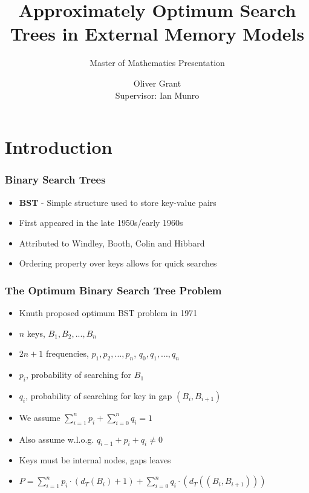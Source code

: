 \documentclass[]{beamer}
\title{Approximately Optimum Search
Trees in External Memory Models}
\subtitle{Master of Mathematics Presentation}
\author{Oliver Grant \\
Supervisor: Ian Munro}
\theoremstyle{plain}
\begin{document}
 \date{}
\begin{frame}
  \titlepage
\end{frame}


\section{Introduction}

\begin{frame} \frametitle{Binary Search Trees}

\begin{itemize}

\item \textbf{BST} - Simple structure used to store key-value pairs

\item First appeared in the late 1950s/early 1960s

\item Attributed to Windley, Booth, Colin and Hibbard \cite{windley1960trees, booth1960efficiency, hibbard1962some}

\item Ordering property over keys allows for quick searches

\end{itemize}
\end{frame}

\begin{frame} \frametitle{The Optimum Binary Search Tree Problem}

\begin{itemize}

\item Knuth proposed optimum BST problem in 1971 \cite{knuth1971optimum}

\item $n$ keys, $B_1, B_2, ..., B_n$

\item $2n+1$ frequencies, ${p_1, p_2, ..., p_n}$, ${q_0, q_1, ..., q_n}$

\item $p_i$, probability of searching for $B_1$

\item $q_i$, probability of searching for key in gap $(B_i, B_{i+1})$

\item We assume $\sum\limits_{i=1}^n p_i + \sum\limits_{i=0}^n q_i = 1$

\item Also assume w.l.o.g. $q_{i-1}+p_i+q_i \neq 0$

\item Keys must be internal nodes, gaps leaves

\item $P = \sum_{i=1}^{n} p_i \cdot (d_T(B_i)+1) + \sum_{i=0}^{n} q_i \cdot(d_T((B_i, B_{i+1})))$


\end{itemize}
\end{frame}
\end{document}
